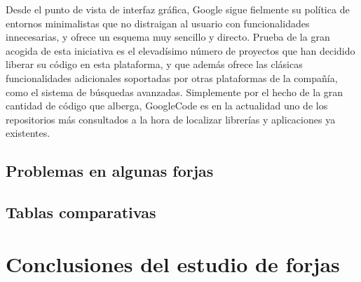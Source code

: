Desde el punto de vista de interfaz gráfica, Google sigue fielmente su política de entornos
minimalistas que no distraigan al usuario con funcionalidades innecesarias, y ofrece un
esquema muy sencillo y directo. Prueba de la gran acogida de esta iniciativa es el
elevadísimo número de proyectos que han decidido liberar su código en esta plataforma, y
que además ofrece las clásicas funcionalidades adicionales soportadas por otras
plataformas de la compañía, como el sistema de búsquedas avanzadas. Simplemente por
el hecho de la gran cantidad de código que alberga, GoogleCode es en la actualidad uno
de los repositorios más consultados a la hora de localizar librerías y aplicaciones ya
existentes.


\subsection{Problemas en algunas forjas}
\label{sub:problemas}


\subsection{Tablas comparativas}
\label{sub:comparativa}


\section{Conclusiones del estudio de forjas}
\label{sec:conclusiones}

